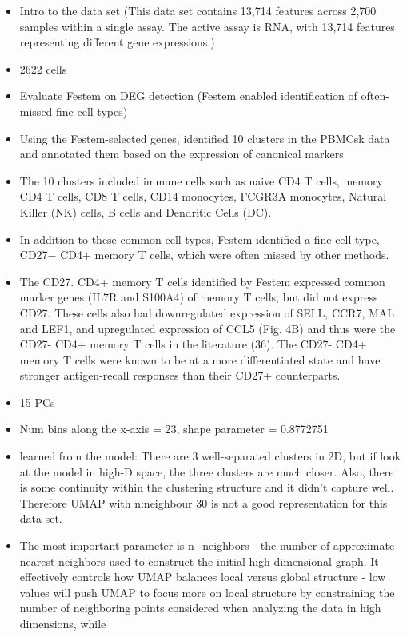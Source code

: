 \documentclass[
  12pt]{article}
\begin{document}
\begin{itemize}
\item
  Intro to the data set (This data set contains 13,714 features across
  2,700 samples within a single assay. The active assay is RNA, with
  13,714 features representing different gene expressions.)
\item
  2622 cells
\item
  Evaluate Festem on DEG detection (Festem enabled identification of
  often-missed fine cell types)
\item
  Using the Festem-selected genes, identified 10 clusters in the PBMCsk
  data and annotated them based on the expression of canonical markers
\item
  The 10 clusters included immune cells such as naive CD4 T cells,
  memory CD4 T cells, CD8 T cells, CD14 monocytes, FCGR3A monocytes,
  Natural Killer (NK) cells, B cells and Dendritic Cells (DC).
\item
  In addition to these common cell types, Festem identified a fine cell
  type, CD27− CD4+ memory T cells, which were often missed by other
  methods.
\item
  The CD27. CD4+ memory T cells identified by Festem expressed common
  marker genes (IL7R and S100A4) of memory T cells, but did not express
  CD27. These cells also had downregulated expression of SELL, CCR7, MAL
  and LEF1, and upregulated expression of CCL5 (Fig. 4B) and thus were
  the CD27- CD4+ memory T cells in the literature (36). The CD27- CD4+
  memory T cells were known to be at a more differentiated state and
  have stronger antigen-recall responses than their CD27+ counterparts.
\item
  15 PCs
\item
  Num bins along the x-axis = 23, shape parameter = 0.8772751
\item
  learned from the model: There are 3 well-separated clusters in 2D, but
  if look at the model in high-D space, the three clusters are much
  closer. Also, there is some continuity within the clustering structure
  and it didn't capture well. Therefore UMAP with n:neighbour 30 is not
  a good representation for this data set.
\item
  The most important parameter is n\_neighbors - the number of
  approximate nearest neighbors used to construct the initial
  high-dimensional graph. It effectively controls how UMAP balances
  local versus global structure - low values will push UMAP to focus
  more on local structure by constraining the number of neighboring
  points considered when analyzing the data in high dimensions, while

\end{itemize}
\end{document}
